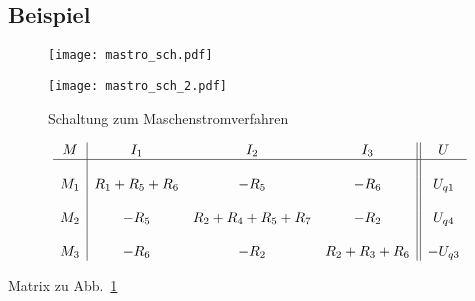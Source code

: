 \newpage

\subsection{Beispiel}
\begin{figure}[h!]
\centering
\texttt{[image: mastro\_sch.pdf]}

\vspace{5mm}

\texttt{[image: mastro\_sch\_2.pdf]}
\caption{Schaltung zum Maschenstromverfahren}
\label{sch:mastro}
\end{figure}

\begin{table}[h!]
\footnotesize
\[ \begin{array}{c|ccc||c}

M	& I_1 & I_2 & I_3 & U \\
\hline &&&& \\
M_1 	& R_1 + R_5 + R_6 	& -R_5 				& -R_6 			& U_{q1} \\
&&&& \\
M_2 	& -R_5 			& R_2 + R_4 + R_5 + R_7 	& -R_2 			& U_{q4} \\
&&&& \\
M_3 	& -R_6 			& -R_2 				& R_2 + R_3 + R_6 	& -U_{q3} \\
\end{array}
\]
\normalsize
\caption{Matrix zu Abb.~\ref{sch:mastro}}
\end{table}

